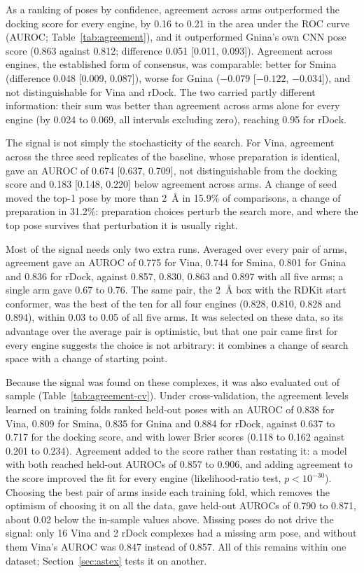 As a ranking of poses by confidence, agreement across arms outperformed the docking score
for every engine, by 0.16 to 0.21 in the area under the ROC curve (AUROC;
Table~\ref{tab:agreement}), and it outperformed Gnina's own CNN pose score (0.863 against
0.812; difference 0.051 [0.011, 0.093]). Agreement across engines, the established form of
consensus, was comparable: better for Smina (difference 0.048 [0.009, 0.087]), worse for
Gnina ($-0.079$ [$-0.122$, $-0.034$]), and not distinguishable for Vina and rDock. The two
carried partly different information: their sum was better than agreement across arms alone
for every engine (by 0.024 to 0.069, all intervals excluding zero), reaching 0.95 for
rDock.

The signal is not simply the stochasticity of the search. For Vina, agreement across the
three seed replicates of the baseline, whose preparation is identical, gave an AUROC of
0.674 [0.637, 0.709], not distinguishable from the docking score and 0.183 [0.148, 0.220]
below agreement across arms. A change of seed moved the top-1 pose by more than
\SI{2}{\angstrom} in 15.9\% of comparisons, a change of preparation in 31.2\%: preparation
choices perturb the search more, and where the top pose survives that perturbation it is
usually right.

Most of the signal needs only two extra runs. Averaged over every pair of arms, agreement
gave an AUROC of 0.775 for Vina, 0.744 for Smina, 0.801 for Gnina and 0.836 for rDock,
against 0.857, 0.830, 0.863 and 0.897 with all five arms; a single arm gave 0.67 to 0.76.
The same pair, the \SI{2}{\angstrom} box with the RDKit start conformer, was the best of the
ten for all four engines (0.828, 0.810, 0.828 and 0.894), within 0.03 to 0.05 of all five
arms. It was selected on these data, so its advantage over the average pair is optimistic,
but that one pair came first for every engine suggests the choice is not arbitrary: it
combines a change of search space with a change of starting point.

Because the signal was found on these complexes, it was also evaluated out of sample
(Table~\ref{tab:agreement-cv}). Under cross-validation, the agreement levels learned on
training folds ranked held-out poses with an AUROC of 0.838 for Vina, 0.809 for Smina, 0.835
for Gnina and 0.884 for rDock, against 0.637 to 0.717 for the docking score, and with lower
Brier scores (0.118 to 0.162 against 0.201 to 0.234). Agreement added to the score rather
than restating it: a model with both reached held-out AUROCs of 0.857 to 0.906, and adding
agreement to the score improved the fit for every engine (likelihood-ratio test, $p <
10^{-30}$). Choosing the best pair of arms inside each training fold, which removes the
optimism of choosing it on all the data, gave held-out AUROCs of 0.790 to 0.871, about 0.02
below the in-sample values above. Missing poses do not drive the signal: only 16 Vina and 2
rDock complexes had a missing arm pose, and without them Vina's AUROC was 0.847 instead of
0.857. All of this remains within one dataset; Section~\ref{sec:astex} tests it on another.

